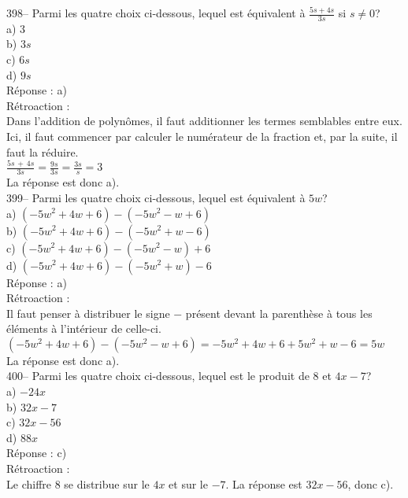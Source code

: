 ﻿\documentclass[letterpaper, 12pt]{article}
\begin{document}
398-- Parmi les quatre choix ci-dessous, lequel est \'equivalent \`a
$\frac{5s+4s}{3s}$ si $s\neq0$?\\
a) 3\\
b) $3s$\\
c) $6s$\\
d) $9s$\\

R\'eponse : a)\\

R\'etroaction : \\
Dans l'addition de polyn\^omes, il faut additionner les termes semblables
entre eux.  Ici, il faut commencer par calculer le num\'erateur de la
fraction et, par la suite, il faut la r\'eduire.\\[2mm]
$\frac{5s\,+\,4s}{3s}=\frac{9s}{3s}=\frac{3s}{s}=3$\\[2mm]
La r\'eponse est donc a).\\

399-- Parmi les quatre choix ci-dessous, lequel est \'equivalent \`a $5w$?\\
a) $\left( -5w^{2}+4w+6\right) -\left( -5w^{2}-w+6\right) $\\
b) $\left( -5w^{2}+4w+6\right) -\left( -5w^{2}+w-6\right) $\\
c) $\left( -5w^{2}+4w+6\right) -\left( -5w^{2}-w\right) +6 $\\
d) $\left( -5w^{2}+4w+6\right) -\left( -5w^{2}+w\right) -6$\\

R\'eponse : a)\\

R\'etroaction : \\
Il faut penser \`a distribuer le signe $-$ pr\'esent devant la parenth\`ese
\`a tous les \'el\'ements \`a l'int\'erieur de celle-ci.\\
$\left( -5w^{2}+4w+6\right) -\left(
-5w^{2}-w+6\right)=-5w^{2}+4w+6+5w^{2}+w-6=5w $\\
La r\'eponse est donc a).\\

400-- Parmi les quatre choix ci-dessous, lequel est le produit de 8 et
$4x-7$?\\
a) $-24x$\\
b) $32x-7$\\
c) $32x-56$\\
d) $88x$\\

R\'eponse : c)\\

R\'etroaction : \\
Le chiffre 8 se distribue sur le $4x$ et sur le $-7$.  La r\'eponse est
$32x-56$, donc c).\\
\end{document}
